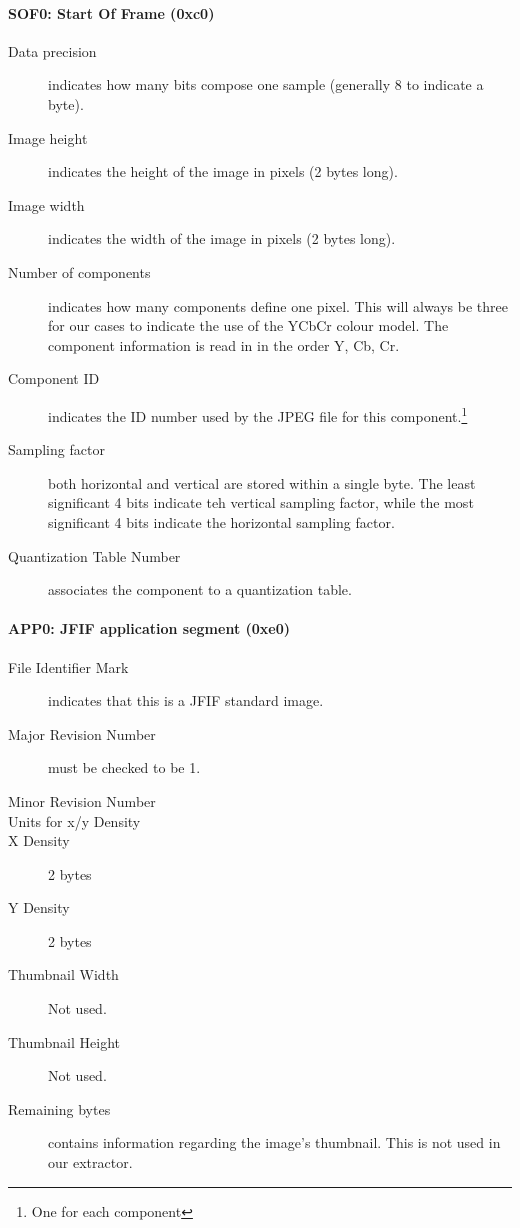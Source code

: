 \paragraph*{SOF0: Start Of Frame (0xc0)}
\begin{description}
	\item[Data precision] indicates how many bits compose one sample (generally 8 to indicate a byte).
	\item[Image height] indicates the height of the image in pixels (2 bytes long).
	\item[Image width] indicates the width of the image in pixels (2 bytes long).
	\item[Number of components] indicates how many components define one pixel. 
		This will always be three for our cases to indicate the use of the YCbCr colour model. 
		The component information is read in in the order Y, Cb, Cr.
	\item[Component ID] indicates the ID number used by the JPEG file for this component.\footnote{One for each component}
	\item[Sampling factor] both horizontal and vertical are stored within a single byte. 
		The least significant 4 bits indicate teh vertical sampling factor, 
		while the most significant 4 bits indicate the horizontal sampling factor.\footnotemark[1] 
	\item[Quantization Table Number] associates the component to a quantization table.\footnotemark[1] 
\end{description}

\paragraph*{APP0: JFIF application segment (0xe0)}
\begin{description}
	\item[File Identifier Mark] indicates that this is a JFIF standard image.
	\item[Major Revision Number] must be checked to be 1.
	\item[Minor Revision Number] 
	\item[Units for x/y Density] 
	\item[X Density]2 bytes
	\item[Y Density]2 bytes
	\item[Thumbnail Width] Not used.
	\item[Thumbnail Height] Not used.
	\item[Remaining bytes] contains information regarding the image's thumbnail. This is not used in our extractor.
\end{description}

